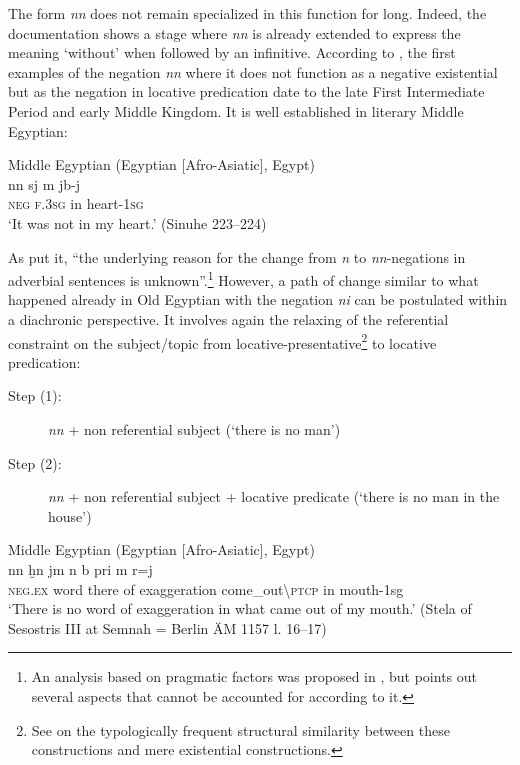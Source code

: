 \documentclass[output=paper,draft,draftmode,colorlinks,citecolor=brown]{langscibook}
\begin{document}
The form \textit{nn} does not remain specialized in this function for long. Indeed, the documentation shows a stage where \textit{nn} is already extended to express the meaning ‘without’ when followed by an infinitive. According to \citet[256–257]{Loprieno-etal2017}, the first examples of the negation \textit{nn} where it does not function as a negative existential but as the negation in locative predication date to the late First Intermediate Period and early Middle Kingdom. It is well established in literary Middle Egyptian: 

\ea Middle Egyptian (Egyptian [Afro-Asiatic], Egypt) \label{ex:AE30}\\
    \gll nn sj m jb-j\\ 
    \textsc{neg} \textsc{f.3sg} in heart-\textsc{1sg}\\ 
    \glt ‘It was not in my heart.’ (Sinuhe 223–224) 
\z 

As \citet[257]{Loprieno-etal2017} put it, ``the underlying reason for the change from \textit{n} to \textit{nn}-negations in adverbial sentences is unknown''.\footnote{An analysis based on pragmatic factors was proposed in \citet{Loprieno1991}, but \citet{Uljas2013} points out several aspects that cannot be accounted for according to it.} However, a path of change
similar to what happened already in Old Egyptian with the negation \textit{ni} can be postulated within a diachronic perspective. It involves again the relaxing of the referential constraint on the subject/topic from locative-presentative\footnote{See \citet[108]{Veselinova2013} on the typologically frequent structural similarity between these constructions and mere existential constructions.} to locative predication:  

\begin{description}
\item[Step (1):] \textit{nn} + non referential subject (‘there is no man’) 
\item[Step (2):] \textit{nn} + non referential subject + locative predicate (‘there is no man in the house’) 
\end{description}

\ea Middle Egyptian (Egyptian [Afro-Asiatic], Egypt) \label{ex:AE31}\\
    \gll nn ḫn jm n {\ꜥ}b{\ꜥ} pri m r{\ꜣ}=j\\
    \textsc{neg.ex} word there of exaggeration come\_out\textbackslash\textsc{ptcp} in mouth-1sg\\ 
    \glt ‘There is no word of exaggeration in what came out of my mouth.’ (Stela of Sesostris III at Semnah = Berlin ÄM 1157 l. 16–17)
\z 
\end{document}
